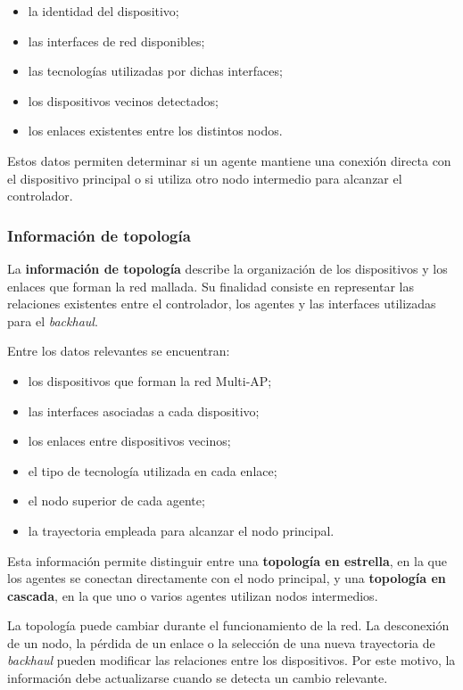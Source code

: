 \begin{itemize}
    \item la identidad del dispositivo;
    \item las interfaces de red disponibles;
    \item las tecnologías utilizadas por dichas interfaces;
    \item los dispositivos vecinos detectados;
    \item los enlaces existentes entre los distintos nodos.
\end{itemize}

Estos datos permiten determinar si un agente mantiene una conexión
directa con el dispositivo principal o si utiliza otro nodo intermedio
para alcanzar el controlador.


\subsubsection*{Información de topología}

La \textbf{información de topología} describe la organización de los
dispositivos y los enlaces que forman la red mallada. Su finalidad
consiste en representar las relaciones existentes entre el controlador,
los agentes y las interfaces utilizadas para el
\textit{backhaul}.

Entre los datos relevantes se encuentran:

\begin{itemize}
    \item los dispositivos que forman la red Multi-AP;
    \item las interfaces asociadas a cada dispositivo;
    \item los enlaces entre dispositivos vecinos;
    \item el tipo de tecnología utilizada en cada enlace;
    \item el nodo superior de cada agente;
    \item la trayectoria empleada para alcanzar el nodo principal.
\end{itemize}

Esta información permite distinguir entre una
\textbf{topología en estrella}, en la que los agentes se conectan
directamente con el nodo principal, y una
\textbf{topología en cascada}, en la que uno o varios agentes utilizan
nodos intermedios.

La topología puede cambiar durante el funcionamiento de la red. La
desconexión de un nodo, la pérdida de un enlace o la selección de una
nueva trayectoria de \textit{backhaul} pueden modificar las relaciones
entre los dispositivos. Por este motivo, la información debe actualizarse
cuando se detecta un cambio relevante.



